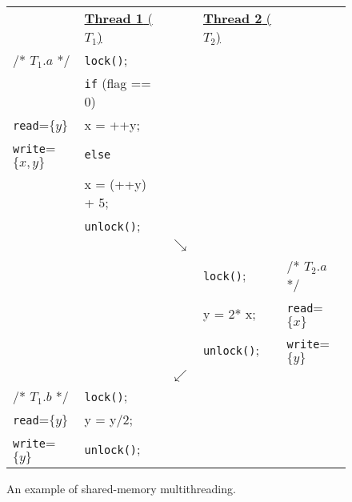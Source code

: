 \begin{figure}[t]
\centering
\myfontsize
{
\begin{tabular}
{m{1.5cm} m{2cm} m{0.1cm} m{1.8cm} m{1.2cm}}
&\underline{{\bf Thread 1} ($T_1$)} & & \underline{ {\bf Thread 2}  ($T_2$)} &\\


/* \underline{$T_{1}.a$} */ & {\tt lock()}; && &\\
& {\tt if} (flag == 0) && &\\
{\tt read}=$\{y\}$  & \hspace{3mm} x = ++y;&& &\\
{\tt write}=$\{x, y\}$  & {\tt else} && &\\
&\hspace{3mm}   x = (++y) + 5;&& &\\
  & {\tt unlock()};&& &\\
        &  &  $\searrow$ & & \\


&&  & {\tt lock()}; &  /* \underline{$T_{2}.a$ }*/\\
&&  & y = 2* x;    & {\tt read}=$\{x\}$  \\
&  &  & {\tt unlock()}; &  {\tt write}=$\{y\}$ \\

 &  &  $\swarrow$ & & \\

/* \underline{$T_{1}.b$} */ & {\tt lock()}; && &\\


{\tt read}=$\{y\}$  & y = y/2;&& &\\
{\tt write}=$\{ y\}$  & {\tt unlock()};  && &\\




\end{tabular}
}


\caption{ An example of shared-memory multithreading.}
\label{fig:simple-example}
\end{figure}
